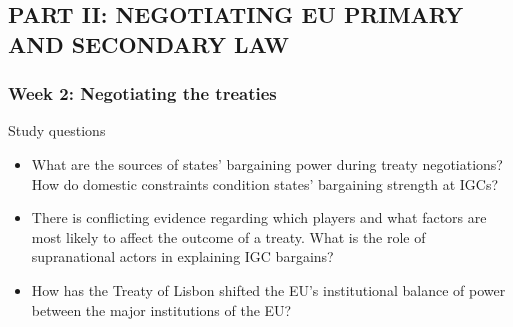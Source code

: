 



\subsection*{PART II: NEGOTIATING EU PRIMARY AND SECONDARY LAW}

\subsubsection*{Week 2: Negotiating the treaties}

Study questions

\begin{itemize}
	\item What are the sources of states’ bargaining power during treaty negotiations? How do domestic constraints condition states’ bargaining strength at IGCs?  
    \item There is conflicting evidence regarding which players and what factors are most likely to affect the outcome of a treaty. What is the role of supranational actors in explaining IGC bargains?
    \item How has the Treaty of Lisbon shifted the EU’s institutional balance of power between the major institutions of the EU?
\end{itemize}

